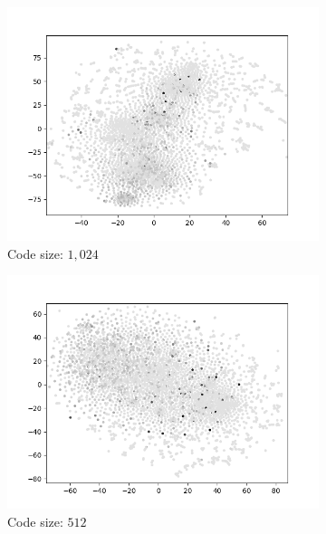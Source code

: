 \begin{figure}[H]
\begin{subfigure}{.25\textwidth}
        \includegraphics[width=\textwidth]{images/figures/experiments_latent/convolutional_dim1024_dsm.png}
        \caption{Code size: $1,024$}
    \end{subfigure}%
    \begin{subfigure}{.25\textwidth}
        \centering
        \includegraphics[width=\textwidth]{images/figures/experiments_latent/convolutional_dim512_dsm.png}
        \caption{Code size: $512$}
    \end{subfigure}%
    \begin{subfigure}{.25\textwidth}
        \centering

\end{subfigure}
\end{figure}
